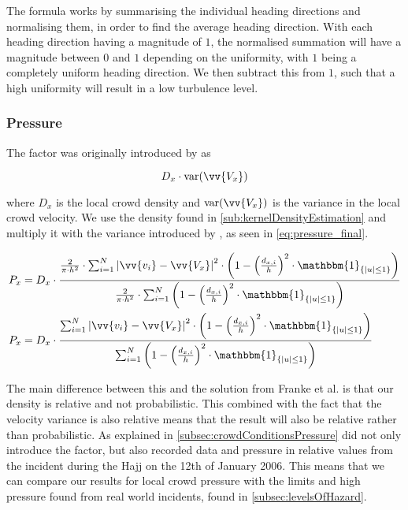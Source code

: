 The formula works by summarising the individual heading directions and normalising them, in order to find the average heading direction. With each heading direction having a magnitude of $1$, the normalised summation will have a magnitude between $0$ and $1$ depending on the uniformity, with $1$ being a completely uniform heading direction. We then subtract this from $1$, such that a high uniformity will result in a low turbulence level.


\subsubsection{Pressure}
The factor was originally introduced by \citet{empircalstudy} as 

\begin{equation}
D_x \cdot \text{var}(\vv{V_x})
\end{equation}

where $D_x$ is the local crowd density and $\text{var}(\vv{V_x})$ is the variance in the local crowd velocity. We use the density found in \cref{sub:kernelDensityEstimation} and multiply it with the variance introduced by \citet{wirz2012inferring}, as seen in \cref{eq:pressure_final}.

\begin{equation}
\label{eq:pressure_final}
\begin{split}
P_x &= D_x \cdot \frac{\frac{2}{\pi \cdot h^2} \cdot \sum_{i=1}^{N} \left|\vv{v_i} - \vv{V_x}\right|^2 \cdot \left(1-\left(\frac{d_{x,i}}{h}\right)^2 \cdot \mathbbm{1}_{\{|u| \leq 1\} }\right)}{\frac{2}{\pi \cdot h^2} \cdot \sum_{i=1}^{N} \left(1-\left(\frac{d_{x,i}}{h}\right)^2 \cdot \mathbbm{1}_{\{|u| \leq 1\} }\right)}\\
%
%
P_x &= D_x \cdot \frac{\sum_{i=1}^{N} \left|\vv{v_i} - \vv{V_x}\right|^2 \cdot \left(1-\left(\frac{d_{x,i}}{h}\right)^2 \cdot \mathbbm{1}_{\{|u| \leq 1\} }\right)}{\sum_{i=1}^{N} \left(1-\left(\frac{d_{x,i}}{h}\right)^2 \cdot \mathbbm{1}_{\{|u| \leq 1\} }\right)}
\end{split}
\end{equation}

The main difference between this and the solution from Franke et al. is that our density is relative and not probabilistic. This combined with the fact that the velocity variance is also relative means that the result will also be relative rather than probabilistic. As explained in \cref{subsec:crowdConditionsPressure} \citet{empircalstudy} did not only introduce the factor, but also recorded data and pressure in relative values from the incident during the Hajj on the 12th of January 2006\cite{website:Wikipedia-Hajj}. This means that we can compare our results for local crowd pressure with the limits and high pressure found from real world incidents, found in \cref{subsec:levelsOfHazard}.

